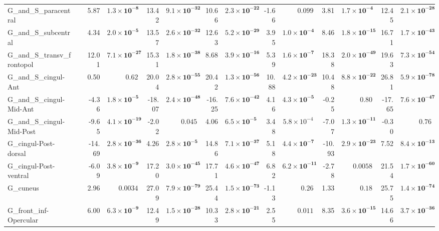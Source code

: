 {\begin{longtable}{llrrrrrrrrrrrr}
G\_and\_S\_paracentral &  & 5.87 & $\mathbf{1.3{\times}10^{-8}}$ & 13.42 & $\mathbf{9.1{\times}10^{-32}}$ & 10.66 & $\mathbf{2.3{\times}10^{-22}}$ & -1.66 & $0.099$ & 3.81 & $\mathbf{1.7{\times}10^{-4}}$ & 12.45 & $\mathbf{2.1{\times}10^{-28}}$ \\
G\_and\_S\_subcentral &  & 4.34 & $\mathbf{2.0{\times}10^{-5}}$ & 13.57 & $\mathbf{2.6{\times}10^{-32}}$ & 12.63 & $\mathbf{5.2{\times}10^{-29}}$ & 3.95 & $\mathbf{1.0{\times}10^{-4}}$ & 8.46 & $\mathbf{1.8{\times}10^{-15}}$ & 16.71 & $\mathbf{1.7{\times}10^{-43}}$ \\
G\_and\_S\_transv\_frontopol &  & 12.01 & $\mathbf{7.1{\times}10^{-27}}$ & 15.31 & $\mathbf{1.8{\times}10^{-38}}$ & 8.68 & $\mathbf{3.9{\times}10^{-16}}$ & 5.39 & $\mathbf{1.6{\times}10^{-7}}$ & 18.38 & $\mathbf{2.0{\times}10^{-49}}$ & 19.63 & $\mathbf{7.3{\times}10^{-54}}$ \\
G\_and\_S\_cingul-Ant &  & 0.50 & $0.62$ & 20.04 & $\mathbf{2.8{\times}10^{-55}}$ & 20.42 & $\mathbf{1.3{\times}10^{-56}}$ & 10.88 & $\mathbf{4.2{\times}10^{-23}}$ & 10.48 & $\mathbf{8.8{\times}10^{-22}}$ & 26.81 & $\mathbf{5.9{\times}10^{-78}}$ \\
G\_and\_S\_cingul-Mid-Ant &  & -4.36 & $\mathbf{1.8{\times}10^{-5}}$ & -18.07 & $\mathbf{2.4{\times}10^{-48}}$ & -16.25 & $\mathbf{7.6{\times}10^{-42}}$ & 4.16 & $\mathbf{4.3{\times}10^{-5}}$ & -0.25 & $0.80$ & -17.65 & $\mathbf{7.6{\times}10^{-47}}$ \\
G\_and\_S\_cingul-Mid-Post &  & -9.65 & $\mathbf{4.1{\times}10^{-19}}$ & -2.02 & $0.045$ & 4.06 & $\mathbf{6.5{\times}10^{-5}}$ & 3.48 & $5.8{\times}10^{-4}$ & -7.07 & $\mathbf{1.3{\times}10^{-11}}$ & -0.30 & $0.76$ \\
G\_cingul-Post-dorsal &  & -14.69 & $\mathbf{2.8{\times}10^{-36}}$ & 4.26 & $\mathbf{2.8{\times}10^{-5}}$ & 14.86 & $\mathbf{7.1{\times}10^{-37}}$ & 5.18 & $\mathbf{4.4{\times}10^{-7}}$ & -10.93 & $\mathbf{2.9{\times}10^{-23}}$ & 7.52 & $\mathbf{8.4{\times}10^{-13}}$ \\
G\_cingul-Post-ventral &  & -6.09 & $\mathbf{3.8{\times}10^{-9}}$ & 17.20 & $\mathbf{3.0{\times}10^{-45}}$ & 17.71 & $\mathbf{4.6{\times}10^{-47}}$ & 6.82 & $\mathbf{6.2{\times}10^{-11}}$ & -2.78 & $0.0058$ & 21.54 & $\mathbf{1.7{\times}10^{-60}}$ \\
G\_cuneus &  & 2.96 & $0.0034$ & 27.09 & $\mathbf{7.9{\times}10^{-79}}$ & 25.44 & $\mathbf{1.5{\times}10^{-73}}$ & -1.13 & $0.26$ & 1.33 & $0.18$ & 25.75 & $\mathbf{1.4{\times}10^{-74}}$ \\
G\_front\_inf-Opercular &  & 6.00 & $\mathbf{6.3{\times}10^{-9}}$ & 12.49 & $\mathbf{1.5{\times}10^{-28}}$ & 10.33 & $\mathbf{2.8{\times}10^{-21}}$ & 2.55 & $0.011$ & 8.35 & $\mathbf{3.6{\times}10^{-15}}$ & 14.66 & $\mathbf{3.7{\times}10^{-36}}$ \\

\end{longtable}}
